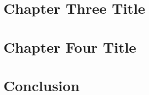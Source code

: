 \documentclass[11pt]{report}
\begin{document}
\section{Chapter Three Title}


\section{Chapter Four Title}


\section{Conclusion}


\printbibliography[heading=bibintoc]

\begin{appendix}

\end{appendix}
\end{document}

